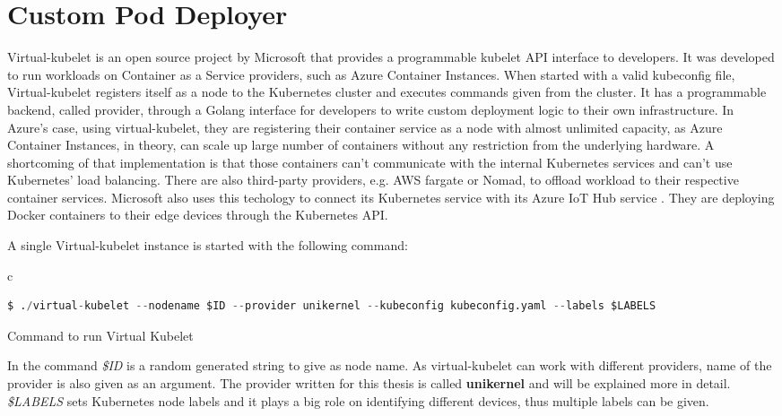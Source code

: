 \section{Custom Pod Deployer}
Virtual-kubelet \cite{virtual} is an open source project by Microsoft that provides a programmable kubelet API interface to developers. It was developed to run workloads on Container as a Service providers, such as Azure Container Instances. When started with a valid kubeconfig file, Virtual-kubelet registers itself as a node to the Kubernetes cluster and executes commands given from the cluster. It has a programmable backend, called provider, through a Golang interface for developers to write custom deployment logic to their own infrastructure. In Azure's case, using virtual-kubelet, they are registering their container service as a node with almost unlimited capacity, as Azure Container Instances, in theory, can scale up large number of containers without any restriction from the underlying hardware. A shortcoming of that implementation is that those containers can't communicate with the internal Kubernetes services and can't use Kubernetes' load balancing. There are also third-party providers, e.g. AWS fargate or Nomad, to offload workload to their respective container services. Microsoft also uses this techology to connect its Kubernetes service with its Azure IoT Hub service \cite{Chandra2019}. They are deploying Docker containers to their edge devices through the Kubernetes API.

A single Virtual-kubelet instance is started with the following command:
\begin{code}[htpb]
  \centering
  \begin{tabular}{c}
    \begin{lstlisting}[language=python]
      $ ./virtual-kubelet --nodename $ID --provider unikernel --kubeconfig kubeconfig.yaml --labels $LABELS
      \end{lstlisting}
\end{tabular}
\caption{Command to run Virtual Kubelet}\label{lst:vkcommand}
\end{code}


In the command \textit{\$ID} is a random generated string to give as node name. As virtual-kubelet can work with different providers, name of the provider is also given as an argument. The provider written for this thesis is called \textbf{unikernel} and will be explained more in detail. \textit{\$LABELS} sets Kubernetes node labels and it plays a big role on identifying different devices, thus multiple labels can be given.

